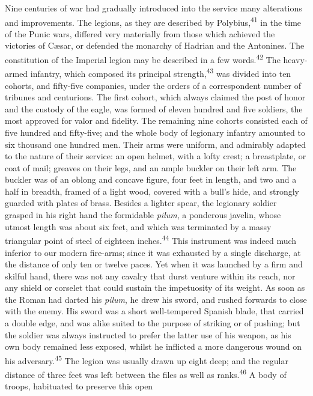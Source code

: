 Nine centuries of war had gradually introduced into the service
many alterations and improvements. The legions, as they are
described by Polybius,\textsuperscript{41} in the time of the Punic wars, differed
very materially from those which achieved the victories of Cæsar,
or defended the monarchy of Hadrian and the Antonines. The
constitution of the Imperial legion may be described in a few
words.\textsuperscript{42} The heavy-armed infantry, which composed its principal
strength,\textsuperscript{43} was divided into ten cohorts, and fifty-five
companies, under the orders of a correspondent number of tribunes
and centurions. The first cohort, which always claimed the post
of honor and the custody of the eagle, was formed of eleven
hundred and five soldiers, the most approved for valor and
fidelity. The remaining nine cohorts consisted each of five
hundred and fifty-five; and the whole body of legionary infantry
amounted to six thousand one hundred men. Their arms were
uniform, and admirably adapted to the nature of their service: an
open helmet, with a lofty crest; a breastplate, or coat of mail;
greaves on their legs, and an ample buckler on their left arm.
The buckler was of an oblong and concave figure, four feet in
length, and two and a half in breadth, framed of a light wood,
covered with a bull’s hide, and strongly guarded with plates of
brass. Besides a lighter spear, the legionary soldier grasped in
his right hand the formidable \textit{pilum}, a ponderous javelin, whose
utmost length was about six feet, and which was terminated by a
massy triangular point of steel of eighteen inches.\textsuperscript{44} This
instrument was indeed much inferior to our modern fire-arms;
since it was exhausted by a single discharge, at the distance of
only ten or twelve paces. Yet when it was launched by a firm and
skilful hand, there was not any cavalry that durst venture within
its reach, nor any shield or corselet that could sustain the
impetuosity of its weight. As soon as the Roman had darted his
\textit{pilum}, he drew his sword, and rushed forwards to close with the
enemy. His sword was a short well-tempered Spanish blade, that
carried a double edge, and was alike suited to the purpose of
striking or of pushing; but the soldier was always instructed to
prefer the latter use of his weapon, as his own body remained
less exposed, whilst he inflicted a more dangerous wound on his
adversary.\textsuperscript{45} The legion was usually drawn up eight deep; and the
regular distance of three feet was left between the files as well
as ranks.\textsuperscript{46} A body of troops, habituated to preserve this open
